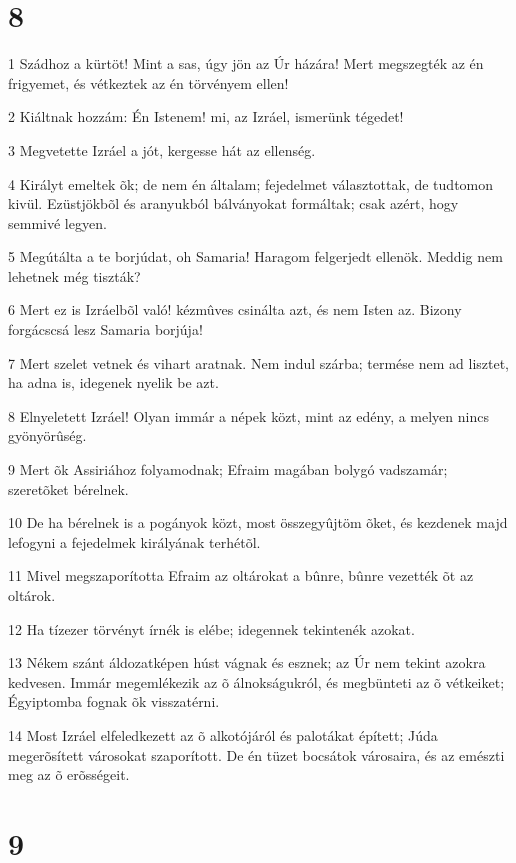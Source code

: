 \chapter{8}

\par 1 Szádhoz a kürtöt! Mint a sas, úgy jön az Úr házára! Mert megszegték az én frigyemet, és vétkeztek  az én törvényem ellen!
\par 2 Kiáltnak hozzám: Én Istenem! mi, az Izráel, ismerünk tégedet!
\par 3 Megvetette Izráel a jót, kergesse hát az ellenség.
\par 4 Királyt emeltek õk; de nem én általam; fejedelmet választottak, de tudtomon kivül. Ezüstjökbõl és aranyukból bálványokat formáltak; csak azért, hogy semmivé legyen.
\par 5 Megútálta a te borjúdat, oh Samaria! Haragom felgerjedt ellenök. Meddig nem lehetnek még tiszták?
\par 6 Mert ez is Izráelbõl való! kézmûves csinálta azt, és nem Isten az. Bizony forgácscsá lesz Samaria borjúja!
\par 7 Mert szelet vetnek és vihart aratnak. Nem indul szárba; termése nem ad lisztet, ha adna is, idegenek nyelik be azt.
\par 8 Elnyeletett Izráel! Olyan immár a népek közt, mint az edény, a melyen nincs gyönyörûség.
\par 9 Mert õk Assiriához folyamodnak; Efraim magában bolygó vadszamár; szeretõket bérelnek.
\par 10 De ha bérelnek is a pogányok közt, most összegyûjtöm õket, és kezdenek majd lefogyni a fejedelmek királyának terhétõl.
\par 11 Mivel megszaporította Efraim az oltárokat a bûnre, bûnre vezették õt az oltárok.
\par 12 Ha tízezer törvényt írnék is elébe; idegennek tekintenék azokat.
\par 13 Nékem szánt áldozatképen húst vágnak és esznek; az Úr nem tekint azokra kedvesen. Immár megemlékezik az õ álnokságukról, és megbünteti az õ vétkeiket; Égyiptomba fognak õk  visszatérni.
\par 14 Most Izráel elfeledkezett az õ alkotójáról és palotákat épített; Júda megerõsített városokat szaporított. De én tüzet bocsátok városaira, és az emészti meg az õ erõsségeit.

\chapter{9}

